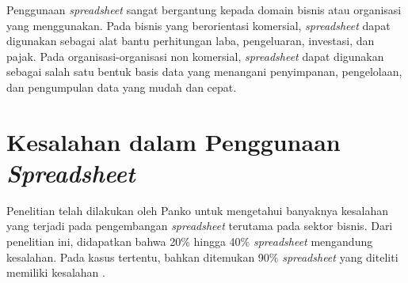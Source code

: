 Penggunaan \textit{spreadsheet} sangat bergantung kepada domain bisnis atau organisasi yang menggunakan. Pada bisnis yang berorientasi komersial, \textit{spreadsheet} dapat digunakan sebagai alat bantu perhitungan laba, pengeluaran, investasi, dan pajak. Pada organisasi-organisasi non komersial, \textit{spreadsheet} dapat digunakan sebagai salah satu bentuk basis data yang menangani penyimpanan, pengelolaan, dan pengumpulan data yang mudah dan cepat.

\section{Kesalahan dalam Penggunaan \textit{Spreadsheet}}
Penelitian telah dilakukan oleh Panko \parencite{Panko1998} untuk mengetahui banyaknya kesalahan yang terjadi pada pengembangan \textit{spreadsheet} terutama pada sektor bisnis. Dari penelitian ini, didapatkan bahwa 20\% hingga 40\% \textit{spreadsheet} mengandung kesalahan. Pada kasus tertentu, bahkan ditemukan 90\% \textit{spreadsheet} yang diteliti memiliki kesalahan \parencite{Journal1996}. 

